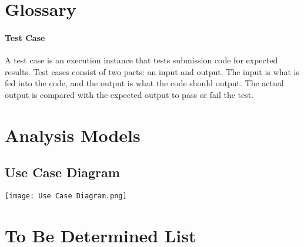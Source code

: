 \documentclass{article}
\begin{document}


\newpage
\appendix


\section{Glossary}

\paragraph{Test Case} A test case is an execution instance that tests submission code for expected results. Test cases consist of two parts: an input and output. The input is what is fed into the code, and the output is what the code should output. The actual output is compared with the expected output to pass or fail the test.


\newpage
\section{Analysis Models}
\subsection{Use Case Diagram}
\texttt{[image: Use Case Diagram.png]}

\newpage
\section{To Be Determined List}
\end{document}

